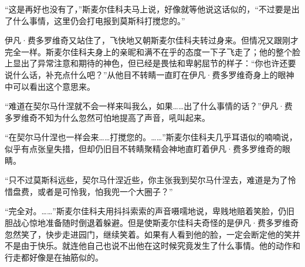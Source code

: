 \par “这是再好也没有了，”斯麦尔佳科夫马上说，好像就等他说这话似的，“不过要是出了什么事情，这里仍会打电报到莫斯科打搅您的。”
\par 伊凡·费多罗维奇又站住了，飞快地又朝斯麦尔佳科夫转过身来。但情况又跟刚才完全一样。斯麦尔佳科夫身上的亲昵和满不在乎的态度一下子飞走了；他的整个脸上显出了异常注意和期待的神色，但已经是畏怯和卑躬屈节的样子：“你也许还要说什么话，补充点什么吧？”从他目不转睛一直盯在伊凡·费多罗维奇身上的眼神中可以看出这个意思来。
\par “难道在契尔马什涅就不会一样来叫我么，如果……出了什么事情的话？”伊凡·费多罗维奇不知为什么忽然可怕地提高了声音，吼叫起来。
\par “在契尔马什涅也一样会来……打搅您的。……”斯麦尔佳科夫几乎耳语似的喃喃说，似乎有点张皇失措，但却仍旧目不转睛聚精会神地直盯着伊凡·费多罗维奇的眼睛。
\par “只不过莫斯科远些，契尔马什涅近些，你主张我到契尔马什涅去，难道是为了怜惜盘费，或者是可怜我，怕我兜一个大圈子？”
\par “完全对。……”斯麦尔佳科夫用抖抖索索的声音嗫嚅地说，卑贱地赔着笑脸，仍旧胆战心惊地准备随时倒退着躲避。但是使斯麦尔佳科夫奇怪的是伊凡·费多罗维奇忽然笑了，快步走进园门，继续笑着。如果有人看到他的脸，一定会断定他的笑并不是由于快乐。就连他自己也说不出他在这时候究竟发生了什么事情。他的动作和行走都好像是在抽筋似的。
